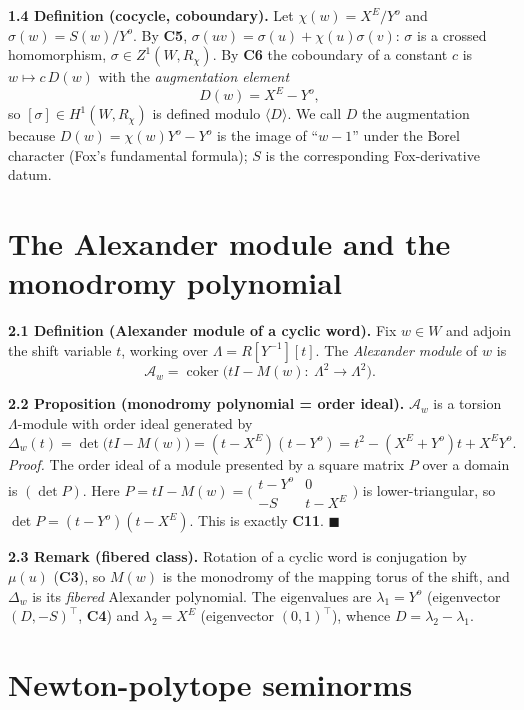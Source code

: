 \documentclass[11pt]{article}
\begin{document}
\medskip
\textbf{1.4 Definition (cocycle, coboundary).} Let $\chi(w)=X^{E}/Y^{o}$ and
$\sigma(w)=S(w)/Y^{o}$. By \textbf{C5}, $\sigma(uv)=\sigma(u)+\chi(u)\sigma(v)$:
$\sigma$ is a crossed homomorphism, $\sigma\in Z^{1}(W,R_\chi)$. By \textbf{C6} the
coboundary of a constant $c$ is $w\mapsto c\,D(w)$ with the \emph{augmentation element}
\[
D(w)=X^{E}-Y^{o},
\]
so $[\sigma]\in H^{1}(W,R_\chi)$ is defined modulo $\langle D\rangle$. We call $D$ the
augmentation because $D(w)=\chi(w)Y^{o}-Y^{o}$ is the image of ``$w-1$'' under the
Borel character (Fox's fundamental formula); $S$ is the corresponding Fox-derivative
datum.

\hrulefill

\section{The Alexander module and the monodromy polynomial}

\textbf{2.1 Definition (Alexander module of a cyclic word).} Fix $w\in W$ and adjoin
the shift variable $t$, working over $\Lambda=R[Y^{-1}][t]$. The \emph{Alexander
module} of $w$ is
\[
\mathcal A_w=\operatorname{coker}\!\big(tI-M(w):\ \Lambda^{2}\to\Lambda^{2}\big).
\]

\medskip
\textbf{2.2 Proposition (monodromy polynomial = order ideal).} $\mathcal A_w$ is a
torsion $\Lambda$-module with order ideal generated by
\[
\Delta_w(t)=\det\!\big(tI-M(w)\big)=(t-X^{E})(t-Y^{o})=t^{2}-(X^{E}+Y^{o})t+X^{E}Y^{o}.
\]
\emph{Proof.} The order ideal of a module presented by a square matrix $P$ over a
domain is $(\det P)$. Here
$P=tI-M(w)=\big(\begin{smallmatrix}t-Y^{o}&0\\-S&t-X^{E}\end{smallmatrix}\big)$ is
lower-triangular, so $\det P=(t-Y^{o})(t-X^{E})$. This is exactly \textbf{C11}.
\hfill$\blacksquare$

\medskip
\textbf{2.3 Remark (fibered class).} Rotation of a cyclic word is conjugation by
$\mu(u)$ (\textbf{C3}), so $M(w)$ is the monodromy of the mapping torus of the shift,
and $\Delta_w$ is its \emph{fibered} Alexander polynomial. The eigenvalues are
$\lambda_1=Y^{o}$ (eigenvector $(D,-S)^{\top}$, \textbf{C4}) and $\lambda_2=X^{E}$
(eigenvector $(0,1)^{\top}$), whence $D=\lambda_2-\lambda_1$.

\hrulefill

\section{Newton-polytope seminorms}
\end{document}

